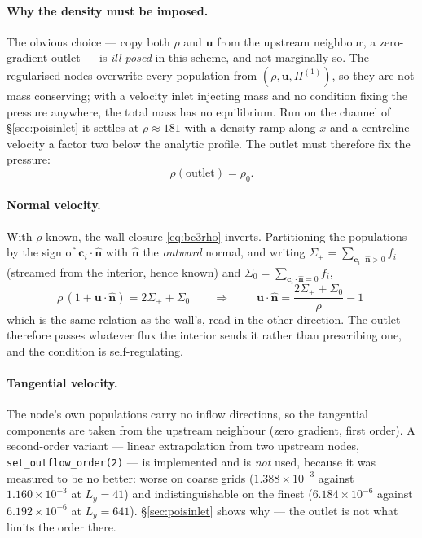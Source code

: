 \documentclass[11pt,a4paper]{article}
\newcommand{\ci}{\bm{c}_i}
\newcommand{\uu}{\bm{u}}
\begin{document}
\paragraph{Why the density must be imposed.} The obvious choice --- copy both
$\rho$ and $\uu$ from the upstream neighbour, a zero-gradient outlet --- is
\emph{ill posed} in this scheme, and not marginally so. The regularised nodes
overwrite every population from $(\rho,\uu,\Pi^{(1)})$, so they are not mass
conserving; with a velocity inlet injecting mass and no condition fixing the
pressure anywhere, the total mass has no equilibrium. Run on the channel of
\S\ref{sec:poisinlet} it settles at $\rho \approx 181$ with a density ramp along
$x$ and a centreline velocity a factor two below the analytic profile. The
outlet must therefore fix the pressure:
\begin{equation}
  \rho(\text{outlet}) = \rho_0 .
\end{equation}

\paragraph{Normal velocity.} With $\rho$ known, the wall closure
\eqref{eq:bc3rho} inverts. Partitioning the populations by the sign of
$\ci\cdot\hat{\bm n}$ with $\hat{\bm n}$ the \emph{outward} normal, and writing
$\Sigma_+=\sum_{\ci\cdot\hat{\bm n}>0}f_i$ (streamed from the interior, hence known)
and $\Sigma_0=\sum_{\ci\cdot\hat{\bm n}=0}f_i$,
\begin{equation}
  \rho\,(1 + \uu\cdot\hat{\bm n}) = 2\Sigma_+ + \Sigma_0
  \qquad\Longrightarrow\qquad
  \boxed{\;\uu\cdot\hat{\bm n} = \frac{2\Sigma_+ + \Sigma_0}{\rho} - 1\;}
  \label{eq:outun}
\end{equation}
which is the same relation as the wall's, read in the other direction. The
outlet therefore passes whatever flux the interior sends it rather than
prescribing one, and the condition is self-regulating.

\paragraph{Tangential velocity.} The node's own populations carry no inflow
directions, so the tangential components are taken from the upstream neighbour
(zero gradient, first order). A second-order variant --- linear extrapolation
from two upstream nodes, \texttt{set\_outflow\_order(2)} --- is implemented and
is \emph{not} used, because it was measured to be no better: worse on coarse
grids ($1.388\times10^{-3}$ against $1.160\times10^{-3}$ at $L_y=41$) and
indistinguishable on the finest ($6.184\times10^{-6}$ against
$6.192\times10^{-6}$ at $L_y=641$). \S\ref{sec:poisinlet} shows why --- the
outlet is not what limits the order there.
\end{document}
